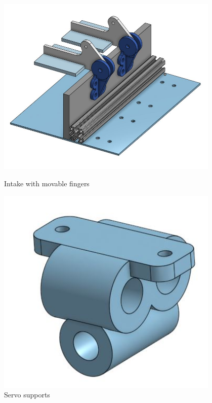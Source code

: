 \begin{figure}[ht]
\centering
\begin{minipage}[b]{.48\textwidth}
  \centering
  \includegraphics[width=0.95\textwidth]{Meetings/October/10-30-21/10-30-21_CAD_Figure4 - Nathan Forrer.JPG}
  \caption{Intake with movable fingers}
  \label{fig:103021_3}
\end{minipage}%
\hfill%
\begin{minipage}[b]{.48\textwidth}
  \centering
  \includegraphics[width=0.95\textwidth]{Meetings/October/10-30-21/10-30-21_CAD_Figure5 - Nathan Forrer.JPG}
  \caption{Servo supports}
  \label{fig:103021_4}
\end{minipage}
\end{figure}

